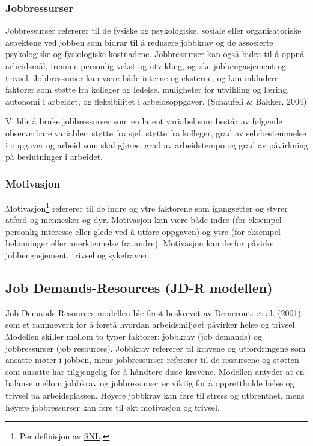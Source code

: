 \documentclass[
  12pt,
  a4paper,
  DIV=11,
  numbers=noendperiod]{scrartcl}
\begin{document}
\subsubsection{Jobbressurser}\label{jobbressurser}

Jobbressurser refererer til de fysiske og psykologiske, sosiale eller
organisatoriske aspektene ved jobben som bidrar til å redusere jobbkrav
og de assosierte psykologiske og fysiologiske kostnadene. Jobbressurser
kan også bidra til å oppnå arbeidsmål, fremme personlig vekst og
utvikling, og øke jobbengasjement og trivsel. Jobbressurser kan være
både interne og eksterne, og kan inkludere faktorer som støtte fra
kolleger og ledelse, muligheter for utvikling og læring, autonomi i
arbeidet, og fleksibilitet i arbeidsoppgaver. (Schaufeli \& Bakker,
2004)

Vi blir å bruke jobbressurser som en latent variabel som består av
følgende observerbare variabler: støtte fra sjef, støtte fra kolleger,
grad av selvbestemmelse i oppgaver og arbeid som skal gjøres, grad av
arbeidstempo og grad av påvirkning på beslutninger i arbeidet.

\subsubsection{Motivasjon}\label{motivasjon}

Motivasjon\footnote{Per definisjon av
  \href{https://snl.no/motivasjon\#:~:text=Motivasjon\%20er\%20en\%20samlebetegnelse\%20for,motiveres\%20til\%20\%C3\%A5\%20oppn\%C3\%A5\%20dette}{SNL}.}
refererer til de indre og ytre faktorene som igangsetter og styrer
atferd og mennesker og dyr. Motivasjon kan være både indre (for eksempel
personlig interesse eller glede ved å utføre oppgaven) og ytre (for
eksempel belønninger eller anerkjennelse fra andre). Motivasjon kan
derfor påvirke jobbengasjement, trivsel og sykefravær.

\subsection{Job Demands-Resources (JD-R
modellen)}\label{job-demands-resources-jd-r-modellen}

Job Demands-Resources-modellen ble først beskrevet av Demerouti et al.
(2001) som et rammeverk for å forstå hvordan arbeidsmiljøet påvirker
helse og trivsel. Modellen skiller mellom to typer faktorer: jobbkrav
(job demands) og jobbressurser (job resources). Jobbkrav refererer til
kravene og utfordringene som ansatte møter i jobben, mens jobbressurser
refererer til de ressursene og støtten som ansatte har tilgjengelig for
å håndtere disse kravene. Modellen antyder at en balanse mellom jobbkrav
og jobbressurser er viktig for å opprettholde helse og trivsel på
arbeidsplassen. Høyere jobbkrav kan føre til stress og utbrenthet, mens
høyere jobbressurser kan føre til økt motivasjon og trivsel.
\end{document}
